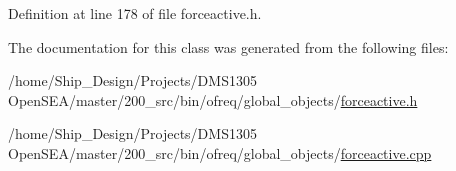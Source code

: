 Definition at line 178 of file forceactive.\-h.



The documentation for this class was generated from the following files\-:\begin{DoxyCompactItemize}
\item 
/home/\-Ship\-\_\-\-Design/\-Projects/\-D\-M\-S1305 Open\-S\-E\-A/master/200\-\_\-src/bin/ofreq/global\-\_\-objects/\hyperlink{forceactive_8h}{forceactive.\-h}\item 
/home/\-Ship\-\_\-\-Design/\-Projects/\-D\-M\-S1305 Open\-S\-E\-A/master/200\-\_\-src/bin/ofreq/global\-\_\-objects/\hyperlink{forceactive_8cpp}{forceactive.\-cpp}\end{DoxyCompactItemize}

